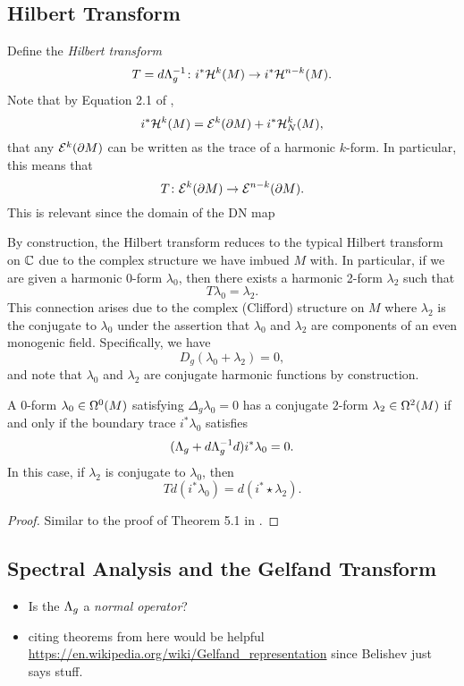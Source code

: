 \documentclass[12pt]{article}
\begin{document}
\subsection{Hilbert Transform}

Define the \emph{Hilbert transform} 
\[
T = d\dnmap^{-1} \colon i^* \harmonic{k}{} \to i^* \harmonic{n-k}{}.
\]
Note that by Equation 2.1 of \cite{shara},
\[
i^* \harmonic{k}{} = \boundaryexact{k} + i^* \harmonic{k}{N},
\]
that any $\boundaryexact{k}$ can be written as the trace of a harmonic $k$-form. In particular, this means that
\[
T \colon \boundaryexact{k} \to \boundaryexact{n-k}.
\]
This is relevant since the domain of the DN map 

By construction, the Hilbert transform reduces to the typical Hilbert transform on $\C$ due to the complex structure we have imbued $M$ with.  In particular, if we are given a harmonic 0-form $\lambda_0$, then there exists a harmonic 2-form $\lambda_2$ such that
\[
T\lambda_0 = \lambda_2.
\]
This connection arises due to the complex (Clifford) structure on $M$ where $\lambda_2$ is the conjugate to $\lambda_0$ under the assertion that $\lambda_0$ and $\lambda_2$ are components of an even monogenic field. Specifically, we have
\[
D_g (\lambda_0 + \lambda_2) = 0,
\]
and note that $\lambda_0$ and $\lambda_2$ are conjugate harmonic functions by construction.

\begin{theorem}
A 0-form $\lambda_0 \in \kforms{0}{}$ satisfying $\Delta_g \lambda_0=0$ has a conjugate $2$-form $\lambda_2 \in \kforms{2}{}$ if and only if the boundary trace $i^*  \lambda_0$ satisfies
\[
(\dnmap + d \dnmap^{-1} d)i^* \lambda_0 = 0.
\]
In this case, if $\lambda_2$ is conjugate to $\lambda_0$, then
\[
Td(i^* \lambda_0) = d (i^* \star \lambda_2).
\]
\end{theorem}
\begin{proof}
Similar to the proof of Theorem 5.1 in \cite{shara}.
\end{proof}



\subsection{Spectral Analysis and the Gelfand Transform}

\begin{itemize}
	\item Is the $\dnmap$ a \emph{normal operator}? 
	\item citing theorems from here would be helpful \url{https://en.wikipedia.org/wiki/Gelfand_representation} since Belishev just says stuff.
\end{itemize}
\end{document}
